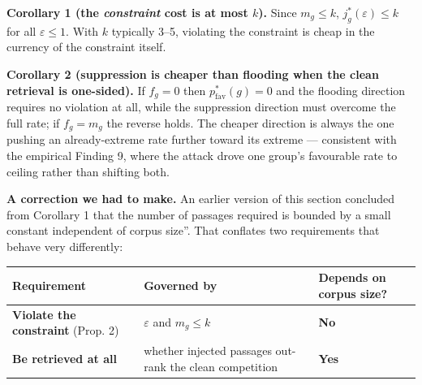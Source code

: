 \documentclass[authoryear,review,3p,times]{elsarticle}
\newcounter{none}
\begin{document}
\textbf{Corollary 1 (the \emph{constraint} cost is at most \(k\)).} Since \(m_g \le k\), \(j^{*}_g(\varepsilon) \le k\) for all \(\varepsilon \le 1\). With \(k\) typically 3--5, violating the constraint is cheap in the currency of the constraint itself.

\textbf{Corollary 2 (suppression is cheaper than flooding when the clean retrieval is one-sided).} If \(f_g = 0\) then \(p^{*}_{\text{fav}}(g) = 0\) and the flooding direction requires no violation at all, while the suppression direction must overcome the full rate; if \(f_g = m_g\) the reverse holds. The cheaper direction is always the one pushing an already-extreme rate further toward its extreme --- consistent with the empirical Finding 9, where the attack drove one group's favourable rate to ceiling rather than shifting both.

\textbf{A correction we had to make.} An earlier version of this section concluded from Corollary 1 that \texttt{}the number of passages required is bounded by a small constant independent of corpus size''. That conflates two requirements that behave very differently:

{\def\LTcaptype{none} %
\begin{longtable}[]{@{}
  >{\raggedright\arraybackslash}p{}
  >{\raggedright\arraybackslash}p{}
  >{\raggedright\arraybackslash}p{}@{}}
\toprule\noalign{}
\begin{minipage}[b]{\linewidth}\raggedright
Requirement
\end{minipage} & \begin{minipage}[b]{\linewidth}\raggedright
Governed by
\end{minipage} & \begin{minipage}[b]{\linewidth}\raggedright
Depends on corpus size?
\end{minipage} \\
\midrule\noalign{}

\bottomrule\noalign{}

\textbf{Violate the constraint} (Prop. 2) & \(\varepsilon\) and \(m_g \le k\) & \textbf{No} \\
\textbf{Be retrieved at all} & whether injected passages out-rank the clean competition & \textbf{Yes} \\
\end{longtable}
}
\end{document}

